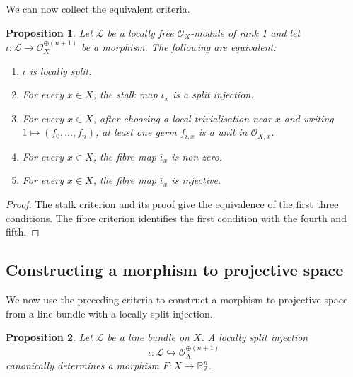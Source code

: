 \documentclass{article}
\theoremstyle{definition}
\theoremstyle{remark}
\theoremstyle{plain}
\newtheorem{proposition}{Proposition}[section]
\newcommand{\Z}{\mathbb{Z}}
\renewcommand{\P}{\mathbb{P}}
\begin{document}
We can now collect the equivalent criteria.

\begin{proposition}\label{prop:lsi-equivalent-conditions}
    Let \(\mathcal{L}\) be a locally free \(\mathcal{O}_X\)-module of rank 1
    and let \(\iota:\mathcal{L}\to\mathcal{O}_X^{\oplus(n+1)}\) be a
    morphism. The following are equivalent:
    \begin{enumerate}
        \item \(\iota\) is locally split.
        \item For every \(x\in X\), the stalk map \(\iota_x\) is a split
        injection.
        \item For every \(x\in X\), after choosing a local trivialisation
        near \(x\) and writing \(1\mapsto(f_0,\dots,f_n)\), at least one
        germ \(f_{i,x}\) is a unit in \(\mathcal{O}_{X,x}\).
        \item For every \(x\in X\), the fibre map
        \(\overline{\iota}_x\) is non-zero.
        \item For every \(x\in X\), the fibre map
        \(\overline{\iota}_x\) is injective.
    \end{enumerate}
\end{proposition}

\begin{proof}
    The stalk criterion and its proof give the equivalence of the first
    three conditions. The fibre criterion identifies the first condition
    with the fourth and fifth.
\end{proof}

\subsection*{Constructing a morphism to projective space}

We now use the preceding criteria to construct a morphism to projective
space from a line bundle with a locally split injection.

\begin{proposition}\label{prop:lsi-map-to-projective-space}
    Let \(\mathcal{L}\) be a line bundle on \(X\). A locally split injection
    \[
        \iota:\mathcal{L}\hookrightarrow
        \mathcal{O}_X^{\oplus(n+1)}
    \]
    canonically determines a morphism
    \(F:X\to\P^n_\Z\).
\end{proposition}
\end{document}
